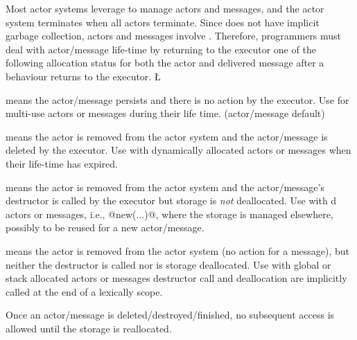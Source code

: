 \documentclass[openright,twoside]{report}
\begin{document}
Most actor systems leverage  to manage actors and messages, and the actor system terminates when all actors terminate.
Since \CC does not have implicit garbage collection, \uC actors and messages involve .
Therefore, programmers must deal with actor/message life-time by returning to the executor one of the following allocation status for both the actor and delivered message after a behaviour returns to the executor.
\LGinlinefalse\LGbegin\lgrinde
\L{}
\CE{}\endlgrinde\LGend
{}%
%
%
%
\vspace*{-15pt}%
\begin{prefix}
\item[\LGinlinetrue\LGbegin\lgrinde\L{\LB{\V{Nodelete}}}\endlgrinde\LGend{}] means the actor/message persists and there is no action by the executor.
Use for multi-use actors or messages during their life time. (actor/message default)
\item[\LGinlinetrue\LGbegin\lgrinde\L{\LB{\V{Delete}}}\endlgrinde\LGend{}] means the actor is removed from the actor system and the actor/message is deleted by the executor.
Use with dynamically allocated actors or messages when their life-time has expired.
\item[\LGinlinetrue\LGbegin\lgrinde\L{\LB{\V{Destroy}}}\endlgrinde\LGend{}] means the actor is removed from the actor system and the actor/message's destructor is called by the executor but storage is \emph{not} deallocated.
Use with d actors or messages, i.e., @new(...)@, where the storage is managed elsewhere, possibly to be reused for a new actor/message.
\item[\LGinlinetrue\LGbegin\lgrinde\L{\LB{\V{Finished}}}\endlgrinde\LGend{}] means the actor is removed from the actor system (no action for a message), but neither the destructor is called nor is storage deallocated.
Use with global or stack allocated actors or messages destructor call and deallocation are implicitly called at the end of a lexically scope.
\end{prefix}
Once an actor/message is deleted/destroyed/finished, no subsequent access is allowed until the storage is reallocated.
\end{document}
